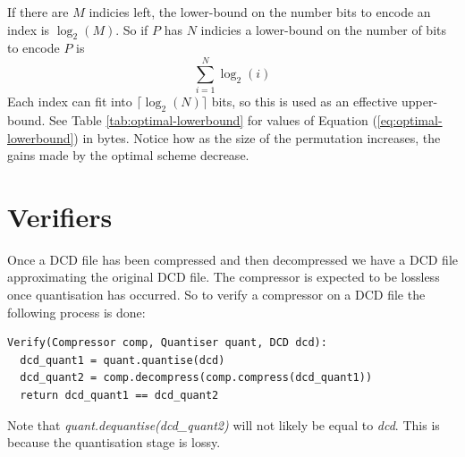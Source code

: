 \documentclass{report}
\begin{document}
If there are $M$ indicies left, the lower-bound on the number bits to encode
an index is $\log_2(M)$. So if $P$ has $N$ indicies a lower-bound on the
number of bits to encode $P$ is
\begin{equation}
  \displaystyle\sum^{N}_{i=1} \log_2(i)
  \label{eq:optimal-lowerbound}
\end{equation}
Each index can fit into $\lceil\log_2(N)\rceil$ bits, so this is used as an
effective upper-bound. See Table \ref{tab:optimal-lowerbound} for values of
Equation (\ref{eq:optimal-lowerbound}) in bytes. Notice how as the size of the
permutation increases, the gains made by the optimal scheme decrease.


\begin{table}
  \center
  \caption{Number of bytes needed for storing permutations of different
    sizes. See Equation (\ref{eq:optimal-lowerbound}) for the lower bound. The
    effective upper-bound is
    $\lceil\log_2(N)\rceil/8$} \label{tab:optimal-lowerbound}
\end{table}




\section{Verifiers}

Once a DCD file has been compressed and then decompressed we have a DCD file
approximating the original DCD file. The compressor is expected to be lossless
once quantisation has occurred. So to verify a compressor on a DCD file the
following process is done:

\begin{verbatim}
Verify(Compressor comp, Quantiser quant, DCD dcd):
  dcd_quant1 = quant.quantise(dcd)
  dcd_quant2 = comp.decompress(comp.compress(dcd_quant1))
  return dcd_quant1 == dcd_quant2
\end{verbatim}

Note that \emph{quant.dequantise(dcd\_quant2)} will not likely be equal to
\emph{dcd}. This is because the quantisation stage is lossy.

\nocite{*}

\end{document}
